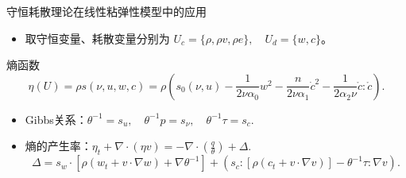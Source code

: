 \documentclass[mathserif]{beamer}
\begin{document}
\begin{frame}{守恒耗散理论在线性粘弹性模型中的应用}
\pause
\begin{itemize}
	\item 取守恒变量、耗散变量分别为
	$	U_c = \{\rho, \rho v, \rho e\},\quad U_d = \{ w, c\}$。
\end{itemize}
\pause
\begin{block}{熵函数}
		\begin{equation*}
		\eta(U)= \rho s(\nu, u, w, c) = \rho(s_0(\nu,u) - \frac{1}{2\nu \alpha_0} w^2 - \frac{n}{2\nu \alpha_1} \dot{c}^2- \frac{1}{2\alpha_2 \nu} \mathring{c}:\mathring{c}).
		\end{equation*}
	\end{block}
\pause
\begin{itemize}
	\item Gibbs关系：$		\theta^{-1} = s_u, \quad \theta^{-1} p = s_{\nu}, \quad \theta^{-1} \tau = s_c.$
	\item 熵的产生率：$\eta_t + \nabla \cdot (\eta v) = -\nabla \cdot (\frac{q}{\theta}) + \Delta.$
		$$\Delta = s_w \cdot [\rho (w_t + v \cdot \nabla w) + \nabla \theta^{-1}] + (s_c:[\rho (c_t + v \cdot \nabla v)] - \theta^{-1} \tau : \nabla v) .$$

\end{itemize}
\end{frame}
\end{document}
